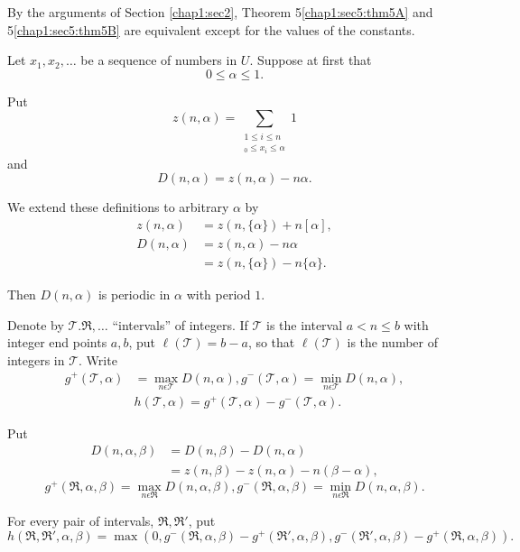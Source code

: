 By the arguments of Section \ref{chap1:sec2}, Theorem 5\ref{chap1:sec5:thm5A} and 5\ref{chap1:sec5:thm5B} are equivalent except for the values of the constants.

Let $x_{1}, x_{2}, \ldots$ be a sequence of numbers in $U$. Suppose at first that
$$
0\leq \alpha\leq 1.
$$

Put 
$$
z(n, \alpha) = \sum_{\substack{1 \leq i \leq n\\_0 \leq x_{i} \leq \alpha}} 1
$$
and\pageoriginale 
$$
D(n, \alpha) = z(n, \alpha) -n\alpha.
$$

We extend these definitions to arbitrary $\alpha$ by
\begin{align*}
z(n, \alpha) & = z(n, \{\alpha\}) + n[\alpha],\\
D(n, \alpha) & = z(n, \alpha) - n\alpha\\
& = z(n, \{\alpha\}) - n\{\alpha\}.
\end{align*}

Then $D(n, \alpha)$ is periodic in $\alpha$ with period $1$.

Denote by $\mathscr{T}. \mathfrak{R}, \ldots$ ``intervals'' of integers. If $\mathscr{T}$ is the interval $a< n\le b$ with integer end points $a, b$, put $\ell(\mathscr{T}) = b-a$, so that $\ell (\mathscr{T})$ is the number of integers in $\mathscr{T}$. Write
\begin{align*}
g^{+} (\mathscr{T}, \alpha) & = \max_{n \epsilon \mathscr{T}} D(n, \alpha), g^{-}(\mathscr{T}, \alpha) = \min_{n \epsilon \mathscr{T}} D(n, \alpha),\\
& h(\mathscr{T}, \alpha) = g^{+}(\mathscr{T}, \alpha) - g^{-} (\mathscr{T}, \alpha).
\end{align*}

Put
\begin{align*}
D(n, \alpha, \beta) & = D(n, \beta) - D(n, \alpha)\\
& = z(n, \beta) - z(n, \alpha) -n(\beta - \alpha),
\end{align*}
$$
g^{+} (\mathfrak{R}, \alpha, \beta) = \max_{n \epsilon \mathfrak{R}} D(n, \alpha, \beta), g^{-} (\mathfrak{R}, \alpha, \beta) = \min_{n \epsilon \mathfrak{R}} D(n, \alpha, \beta).
$$

For every pair of intervals, $\mathfrak{R}, \mathfrak{R}'$, put
{\fontsize{10}{12}\selectfont
$$
h(\mathfrak{R}, \mathfrak{R}', \alpha, \beta) = \max (0, g^{-}
(\mathfrak{R}, \alpha, \beta) - g^{+} (\mathfrak{R}', \alpha, \beta),
g^{-} (\mathfrak{R}', \alpha, \beta) - g^{+} (\mathfrak{R}, \alpha,
\beta)). 
$$}\relax

